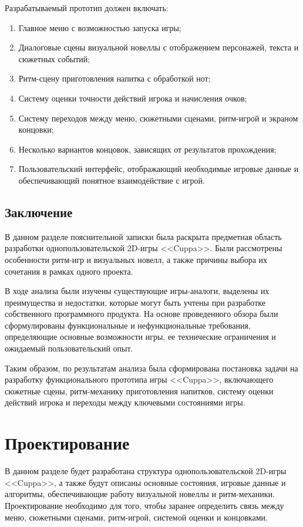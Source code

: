 \documentclass[utf8, russian]{eskdtext}
\numberwithin{equation}{section}
\let\stdsection\section
\renewcommand \section{\newpage\stdsection}
\begin{document}
Разрабатываемый прототип должен включать:

\begin{enumerate}
    \item Главное меню с возможностью запуска игры;
    \item Диалоговые сцены визуальной новеллы с отображением персонажей, текста и сюжетных событий;
    \item Ритм-сцену приготовления напитка с обработкой нот;
    \item Систему оценки точности действий игрока и начисления очков;
    \item Систему переходов между меню, сюжетными сценами, ритм-игрой и экраном концовки;
    \item Несколько вариантов концовок, зависящих от результатов прохождения;
    \item Пользовательский интерфейс, отображающий необходимые игровые данные и обеспечивающий понятное взаимодействие с игрой.
\end{enumerate}

\subsection{Заключение}

В данном разделе пояснительной записки была раскрыта предметная область разработки однопользовательской 2D-игры <<Cuppa>>. Были рассмотрены особенности ритм-игр и визуальных новелл, а также причины выбора их сочетания в рамках одного проекта.

В ходе анализа были изучены существующие игры-аналоги, выделены их преимущества и недостатки, которые могут быть учтены при разработке собственного программного продукта. На основе проведенного обзора были сформулированы функциональные и нефункциональные требования, определяющие основные возможности игры, ее технические ограничения и ожидаемый пользовательский опыт.

Таким образом, по результатам анализа была сформирована постановка задачи на разработку функционального прототипа игры <<Cuppa>>, включающего сюжетные сцены, ритм-механику приготовления напитков, систему оценки действий игрока и переходы между ключевыми состояниями игры.

\section{Проектирование}

В данном разделе будет разработана структура однопользовательской 2D-игры <<Cuppa>>, а также будут описаны основные состояния, игровые данные и алгоритмы, обеспечивающие работу визуальной новеллы и ритм-механики. Проектирование необходимо для того, чтобы заранее определить связь между меню, сюжетными сценами, ритм-игрой, системой оценки и концовками.
\end{document}
